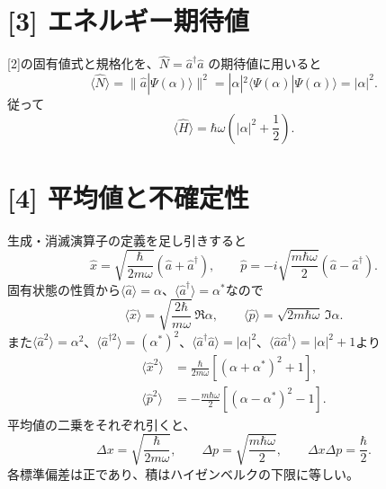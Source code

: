 \documentclass[11pt,a4paper]{article}
\begin{document}
\section*{[3] エネルギー期待値}
[2]の固有値式と規格化を、$\hat N=\hat a^\dagger\hat a$ の期待値に用いると
\begin{equation}
 \langle\hat N\rangle
 =\|\hat a|\Psi(\alpha)\rangle\|^2
 =|\alpha|^2\langle\Psi(\alpha)|\Psi(\alpha)\rangle
 =|\alpha|^2.
\end{equation}
従って
\begin{equation}
  \boxed{\langle\hat H\rangle
  =\hbar\omega\left(|\alpha|^2+\frac12\right).}
\end{equation}

\section*{[4] 平均値と不確定性}
生成・消滅演算子の定義を足し引きすると
\begin{equation}
  \hat x=\sqrt{\frac{\hbar}{2m\omega}}(\hat a+\hat a^\dagger),
  \qquad
  \hat p=-i\sqrt{\frac{m\hbar\omega}{2}}(\hat a-\hat a^\dagger).
\end{equation}
固有状態の性質から$\langle\hat a\rangle=\alpha$、$\langle\hat a^\dagger\rangle=\alpha^*$なので
\begin{equation}
  \boxed{\langle\hat x\rangle=\sqrt{\frac{2\hbar}{m\omega}}\,\Re\alpha},
  \qquad
  \boxed{\langle\hat p\rangle=\sqrt{2m\hbar\omega}\,\Im\alpha}.
\end{equation}
また$\langle\hat a^2\rangle=\alpha^2$、$\langle\hat a^{\dagger2}\rangle=(\alpha^*)^2$、$\langle\hat a^\dagger\hat a\rangle=|\alpha|^2$、$\langle\hat a\hat a^\dagger\rangle=|\alpha|^2+1$より
\begin{align}
  \langle\hat x^2\rangle
  &=\frac{\hbar}{2m\omega}\left[(\alpha+\alpha^*)^2+1\right],\\
  \langle\hat p^2\rangle
  &=-\frac{m\hbar\omega}{2}\left[(\alpha-\alpha^*)^2-1\right].
\end{align}
平均値の二乗をそれぞれ引くと、
\begin{equation}
  \boxed{\Delta x=\sqrt{\frac{\hbar}{2m\omega}}},
  \qquad
  \boxed{\Delta p=\sqrt{\frac{m\hbar\omega}{2}}},
  \qquad
  \boxed{\Delta x\Delta p=\frac{\hbar}{2}}.
\end{equation}
各標準偏差は正であり、積はハイゼンベルクの下限に等しい。
\end{document}
